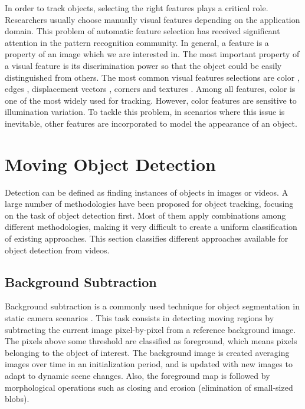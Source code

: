 In order to track objects, selecting the right features plays a critical role.
Researchers usually choose manually visual features depending on the application
domain. This problem of automatic feature selection has received significant
attention in the pattern recognition community. 
In general, a \gls{feature} is a property of an image which we are interested in.
The most important property of a visual feature is its discrimination power so
that the object could be easily distinguished from others. The most common visual
features selections are color  \cite{Paschos2001,Song1996}, edges \cite{Canny1986,
Bowyer2001}, displacement
vectors \cite{Black1996,Lucas1981a}, corners \cite{Harris1988} and textures
\cite{Haralick1973,Nickels1997,Mallat1989}. Among all features, color is one
of the most widely used for tracking. However, color features are sensitive to
illumination variation. To 
tackle this problem, in scenarios where this issue is inevitable, other
features are incorporated to model the appearance of an object.

\section{Moving Object Detection} 
\label{sec::detection}

Detection can be defined as
finding instances of objects in images or videos. A large number of methodologies
have been proposed for object tracking, focusing
on the task of object detection first. Most of them apply combinations among
different methodologies, making it very difficult to create a uniform
classification of existing approaches. This section classifies
different approaches available for object detection from videos.

\subsection{Background Subtraction}

Background subtraction is a commonly used technique for object segmentation in
static camera scenarios \cite{McIvor2000}. This task consists in detecting moving
regions by subtracting the current image pixel-by-pixel from a reference
background image. The pixels above some threshold are classified as foreground,
which means pixels belonging to the object of interest. The background image is 
created  averaging images over time in an initialization period, and is updated
with new images to adapt to dynamic scene changes. Also, the foreground map is 
followed by morphological operations such as closing and erosion (elimination of 
small-sized blobs).

